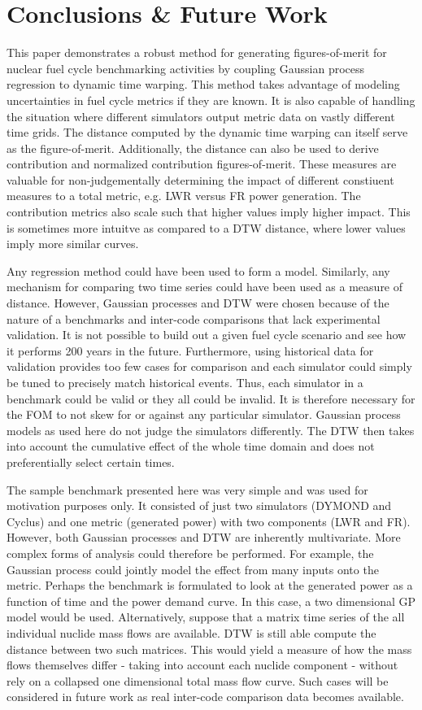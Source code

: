 \section{Conclusions \& Future Work}
\label{conclusion}

This paper demonstrates a robust method for generating figures-of-merit
for nuclear fuel cycle benchmarking activities by coupling Gaussian process
regression to dynamic time warping. This method takes advantage of modeling
uncertainties in fuel cycle metrics if they are known. It is also capable 
of handling the situation where different simulators output metric data on
vastly different time grids. The distance computed by the dynamic time 
warping can itself serve as the figure-of-merit. Additionally, the 
distance can also be used to derive contribution and normalized contribution
figures-of-merit. These measures are valuable for non-judgementally 
determining the impact of different constiuent measures to a total 
metric, e.g. LWR versus FR power generation. The contribution metrics also 
scale such that higher values imply higher impact. This is sometimes
more intuitve as compared to a DTW distance, where lower values imply
more similar curves.

Any regression method could have been used to form a model. Similarly, any
mechanism for comparing two time series could have been used as a measure
of distance.  However, Gaussian processes and DTW were chosen because of 
the nature of a benchmarks and inter-code comparisons that lack experimental
validation. It is not possible to build out a given fuel cycle scenario
and see how it performs 200 years in the future. Furthermore, using 
historical data for validation provides too few cases for comparison and 
each simulator could simply be tuned to precisely match historical events.
Thus, each simulator in a benchmark could be valid or they all could be 
invalid. It is therefore necessary for the FOM to not skew for or against 
any particular simulator. Gaussian process models as used here do not 
judge the simulators differently. The DTW then takes into account the 
cumulative effect of the whole time domain and does not preferentially 
select certain times.

The sample benchmark presented here was very simple and was used for motivation 
purposes only. It consisted of just
two simulators (DYMOND and Cyclus) and one metric (generated power) with
two components (LWR and FR).  However, both Gaussian processes and DTW
are inherently multivariate. More complex forms of analysis could therefore
be performed. For example, the Gaussian process could jointly model the 
effect from many inputs onto the metric. Perhaps the benchmark is formulated
to look at the generated power as a function of time and the power demand curve.
In this case, a two dimensional GP model would be used. Alternatively, 
suppose that a matrix time series of the all individual nuclide mass flows 
are available. DTW is still able compute the distance between two 
such matrices. This would yield a measure of how the mass flows themselves
differ - taking into account each nuclide component - without rely on a collapsed
one dimensional total mass flow curve.  Such cases will be considered in
future work as real inter-code comparison data becomes available.

